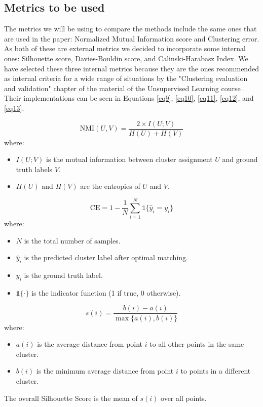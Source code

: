 \documentclass[
	10pt,
	parskip=half-,	
	paper=a4,
	english
	]{scrartcl}
\begin{document}
\subsection{Metrics to be used}

The metrics we will be using to compare the methods include the same ones that are used in the paper: Normalized Mutual Information score and Clustering error. As both of these are external metrics we decided to incorporate some internal ones: Silhouette score, Davies-Bouldin score, and Calinski-Harabasz Index. We have selected these three internal metrics because they are the ones recommended as internal criteria for a wide range of situations by the "Clustering evaluation and validation" chapter of the material of the Unsupervised Learning course \cite{citation2}. Their implementations can be seen in Equations \ref{eq9}, \ref{eq10}, \ref{eq11}, \ref{eq12}, and \ref{eq13}.

\begin{equation}
    \text{NMI}(U, V) = \frac{2 \times I(U; V)}{H(U) + H(V)}
    \label{eq9}
\end{equation}
where:
\begin{itemize}
    \item $I(U; V)$ is the mutual information between cluster assignment $U$ and ground truth labels $V$.
    \item $H(U)$ and $H(V)$ are the entropies of $U$ and $V$.
\end{itemize}

\begin{equation}
    \text{CE} = 1 - \frac{1}{N} \sum_{i=1}^{N} \mathbb{1}\{ \hat{y}_i = y_i \}
    \label{eq10}
\end{equation}
where:
\begin{itemize}
    \item $N$ is the total number of samples.
    \item $\hat{y}_i$ is the predicted cluster label after optimal matching.
    \item $y_i$ is the ground truth label.
    \item $\mathbb{1}\{\cdot\}$ is the indicator function (1 if true, 0 otherwise).
\end{itemize}

\begin{equation}
    s(i) = \frac{b(i) - a(i)}{\max\{a(i), b(i)\}}
    \label{eq11}
\end{equation}
where:
\begin{itemize}
    \item $a(i)$ is the average distance from point $i$ to all other points in the same cluster.
    \item $b(i)$ is the minimum average distance from point $i$ to points in a different cluster.
\end{itemize}
The overall Silhouette Score is the mean of $s(i)$ over all points.
\end{document}
